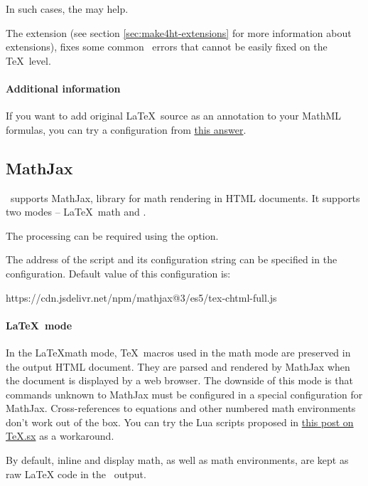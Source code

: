 In such cases, the  may help. 

The 
extension (see section \ref{sec:make4ht-extensions} for more
information about  extensions), fixes some common \mathml\
errors that cannot be easily fixed on the \TeX\ level. 

\paragraph{Additional information}

If you want to add original \LaTeX\ source as an annotation to your MathML formulas,
you can try a configuration from \href{https://tex.stackexchange.com/a/637910/2891}{this answer}.

\subsection{MathJax}
\texfourht\ supports MathJax, library for math rendering in HTML documents. 
 It supports two modes -- \LaTeX\ math and \mathml.

The  processing can be required using the  option.

The address of the  script and its configuration string can be
specified in the \configuration{MathjaxSource} configuration. Default value of this configuration is:

\begin{texsource}
{https://cdn.jsdelivr.net/npm/mathjax@3/es5/tex-chtml-full.js}
\end{texsource}

\paragraph{\LaTeX\ mode}

In the \LaTeX math mode, \TeX\ macros used in the math mode are preserved in
the output HTML document. They are parsed and rendered by MathJax when the
document is displayed by a web browser. The downside of this mode is that
commands unknown to MathJax must be configured in a special configuration for
MathJax. Cross-references to equations and other numbered math environments
don't work out of the box. You can try the Lua scripts proposed in 
\href{https://tex.stackexchange.com/a/597913/2891}{this post on TeX.sx} as
a workaround.

By default, inline and display math, as well as math environments, are kept as
raw LaTeX code in the \HTML\ output. 

